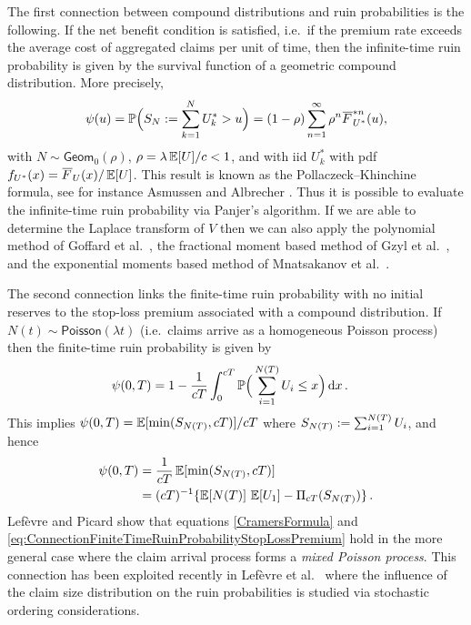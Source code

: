 The first connection between compound distributions and ruin probabilities is the following.
If the net benefit condition is satisfied, i.e.\ if the premium rate exceeds the average cost of aggregated claims per unit of time, then the infinite-time ruin probability is given by the survival function of a geometric compound distribution. More precisely,
\begin{equation*}\label{eq:PollaczeckKhinchineFormula}
\psi(u) = \Prob\Bigl(S_N \defeq \sum_{k=1}^{N}U^\ast_{k}>u\Bigr)
= (1 - \rho) \sum_{n=1}^\infty \rho^n \Ftail_{U^\ast}^{\ast n}(u),
\end{equation*}
with $N \sim \mathsf{Geom}_0(\rho)$, $\rho = \lambda\operatorname{{\mathbb E}}[U]/c<1$, and with iid $U^\ast_{k}$ with pdf $f_{U^\ast}(x)= \Ftail_U(x) / \Exp[U]$. This result is known as the Pollaczeck--Khinchine formula, see for instance Asmussen and Albrecher \cite[Chapter IV, (2.2)]{asmussen2010ruin}. Thus it is possible to evaluate the infinite-time ruin probability via Panjer's algorithm. If we are able to determine the Laplace transform of $V$ then we can also apply the polynomial method of Goffard et al.\ \cite{GoLoPo15}, the fractional moment based method of Gzyl et al.\ \cite{GzNITa13}, and the exponential moments based method of Mnatsakanov et al.\ \cite{Mnatsakanov2015}.

The second connection links the finite-time ruin probability with no initial reserves to the stop-loss premium associated with a compound distribution.
If $N(t) \sim \mathsf{Poisson}(\lambda t)$ (i.e.\ claims arrive as a homogeneous Poisson process) then the finite-time ruin probability is given by
\begin{align} \label{CramersFormula}
\psi(0, T)
&= 1 - \frac{1}{cT} \int_0^{cT} \operatorname{{\mathbb P}} \Bigl( \, \sum_{i=1}^{N(T)} U_i \le x \Bigr) \mathop{}\!\mathrm{d} x \,.
\end{align}
This implies $\psi(0,T) = \operatorname{{\mathbb E}} [ \min( S_{N(T)}, cT ) ]/cT$ where $S_{N(T)} := \sum_{i=1}^{N(T)} U_i$, and hence
\begin{align} \label{eq:ConnectionFiniteTimeRuinProbabilityStopLossPremium}
\psi(0, T)
&= \frac{1}{cT} \operatorname{{\mathbb E}}[ \min( S_{N(T)}, cT ) ] \nonumber \\
&= (cT)^{-1} \{ \operatorname{{\mathbb E}}[N(T)] \, \operatorname{{\mathbb E}}[U_1] - \Pi_{cT}(S_{N(T)}) \} \,.
\end{align}
Lef\`evre and Picard \cite[Corollary~4.3]{LePi11} show that equations \eqref{CramersFormula} and \eqref{eq:ConnectionFiniteTimeRuinProbabilityStopLossPremium} hold in the more general case where the claim arrival process forms a \textit{mixed Poisson process}. This connection has been exploited recently in Lef\`evre et al.\ \cite{LeTrZu17} where the influence of the claim size distribution on the ruin probabilities is studied via stochastic ordering considerations.

